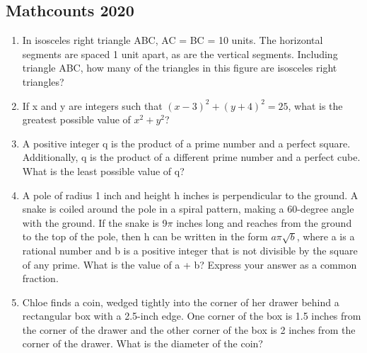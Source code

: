 \documentclass[12pt]{article}
\begin{document}
\thispagestyle{empty}

\begin{center}\section*{Mathcounts 2020}

\end{center}


\begin{enumerate}

\bigskip
\item In isosceles right triangle ABC, AC = BC = 10 units.
The horizontal segments are spaced 1 unit apart, as are the vertical segments.
Including triangle ABC, how many of the triangles in this figure are isosceles right triangles?
\bigskip
\bigskip
\item If x and y are integers such that $(x − 3)^2 + (y + 4)^2 = 25$, what is the greatest
possible value of $x^2 + y^2$?
\bigskip
\bigskip
\item A positive integer q is the product of a prime number and a perfect square.
Additionally, q is the product of a different prime number and a perfect cube.
What is the least possible value of q?
\bigskip
\item A pole of radius 1 inch and height h inches is perpendicular to the ground. A
snake is coiled around the pole in a spiral pattern, making a 60-degree angle
with the ground. If the snake is 9$\pi$ inches long and reaches from the ground to
the top of the pole, then h can be written in the form $a\pi\sqrt{b}$, where a is a rational
number and b is a positive integer that is not divisible by the square of any
prime. What is the value of a + b? Express your answer as a common fraction.
\bigskip
\bigskip
\item Chloe finds a coin, wedged tightly into the corner of
her drawer behind a rectangular box with a 2.5-inch edge. One
corner of the box is 1.5 inches from the corner of the drawer and
the other corner of the box is 2 inches from the corner of the
drawer. What is the diameter of the coin?
\bigskip
\bigskip


\end{enumerate}
\end{document}
